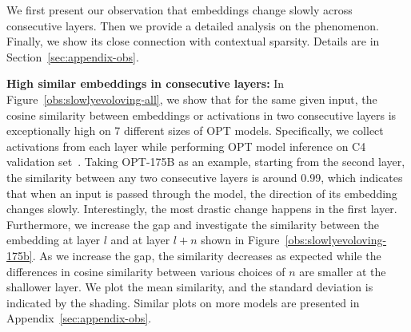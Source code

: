 \begin{figure}[]
  \label{observation_residual} 
\end{figure}

We first present our observation that embeddings change slowly across consecutive layers. Then we provide a detailed analysis on the phenomenon. Finally, we show its close connection with contextual sparsity.  Details are in Section~\ref{sec:appendix-obs}. 

\textbf{High similar embeddings in consecutive layers:} In Figure~\ref{obs:slowlyevoloving-all}, we show that for the same given input, the cosine similarity between embeddings or activations in two consecutive layers is exceptionally high on 7 different sizes of OPT models. Specifically, we collect activations from each layer while performing OPT model inference on C4 validation set~\cite{2019t5}. Taking OPT-175B as an example, starting from the second layer, the similarity between any two consecutive layers is around 0.99, which indicates that when an input is passed through the model, the direction of its embedding  changes slowly. Interestingly, the most drastic change happens in the first layer. Furthermore, we increase the gap and investigate the similarity between the embedding at layer $l$ and at layer $l + n$ shown in Figure~\ref{obs:slowlyevoloving-175b}. As we increase the gap, the similarity decreases as expected while the differences in cosine similarity between various choices of $n$ are smaller at the shallower layer. We plot the mean similarity, and the standard deviation is indicated by the shading. Similar plots on more models are presented in Appendix~\ref{sec:appendix-obs}.  

